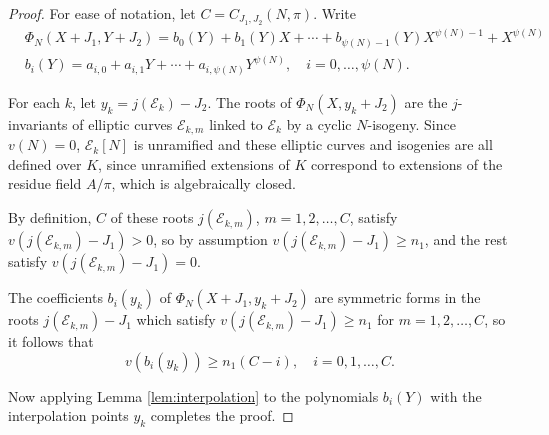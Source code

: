 \documentclass[10pt,a4paper]{amsart}
\def\CE{\mathcal{E}}
\begin{document}
\begin{proof}
	For ease of notation, let $C = C_{J_1,J_2}(N,\pi).$
Write 
\begin{align*}
    & \Phi_N(X+J_1,Y+J_2) = b_0(Y) + b_1(Y)X + \cdots + b_{\psi(N)-1}(Y)X^{\psi(N)-1} + X^{\psi(N)} \\
    & b_i(Y) = a_{i,0} + a_{i,1}Y + \cdots + a_{i,\psi(N)}Y^{\psi(N)}, \quad i=0,\ldots, \psi(N).
\end{align*}

For each $k$, let $y_k = j(\CE_k) - J_2$. The roots of $\Phi_N(X, y_k + J_2)$ are the $j$-invariants of elliptic curves $\CE_{k,m}$ linked to $\CE_k$ by a cyclic $N$-isogeny. Since $v(N)=0$, $\CE_k[N]$ is unramified and these elliptic curves and isogenies are all defined over $K$, since unramified extensions of $K$ correspond to extensions of the residue field $A/\pi$, which is algebraically closed.

By definition, $C$ of these roots $j(\CE_{k,m})$, $m=1,2,\ldots, C$, satisfy 
$v(j(\CE_{k,m})-J_1) >0$, so by assumption $v(j(\CE_{k,m} )-J_1) \geq n_1$, and the rest satisfy $v(j(\CE_{k,m})-J_1)=0$. 

The coefficients $b_i(y_k)$ of 
$\Phi_N(X+J_1, y_k+J_2)$ are symmetric forms in the roots $j(\CE_{k,m})-J_1$ which satisfy $v(j(\CE_{k,m})-J_1) \geq n_1$ for $m=1,2,\ldots, C$, so it follows that
\[
v(b_i(y_k)) \geq n_1(C -i), \quad i = 0, 1, \ldots, C.
\]

Now applying Lemma \ref{lem:interpolation} to the polynomials $b_i(Y)$ with the interpolation points $y_k$ completes the proof.
\end{proof}
\end{document}
